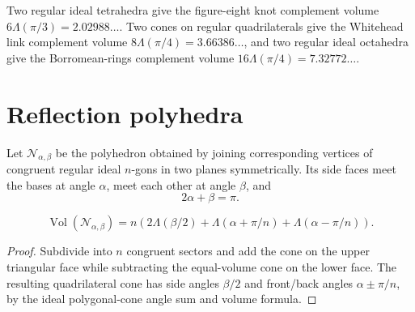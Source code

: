 \begin{example}
\label{thurston-ch07-basic-link-volumes}

Two regular ideal tetrahedra give the figure-eight knot complement volume $6\Lambda(\pi/3)=2.02988\ldots$.  Two cones on regular quadrilaterals give the Whitehead link complement volume $8\Lambda(\pi/4)=3.66386\ldots$, and two regular ideal octahedra give the Borromean-rings complement volume $16\Lambda(\pi/4)=7.32772\ldots$.
\end{example}

\section{Reflection polyhedra}

\begin{definition}
\label{thurston-ch07-symmetric-ideal-prism}

Let $\mathcal N_{\alpha,\beta}$ be the polyhedron obtained by joining corresponding vertices of congruent regular ideal $n$-gons in two planes symmetrically.  Its side faces meet the bases at angle $\alpha$, meet each other at angle $\beta$, and
\[
2\alpha+\beta=\pi.
\]
\end{definition}

\begin{proposition}
\label{thurston-ch07-symmetric-ideal-prism-volume}

\[
\operatorname{Vol}(\mathcal N_{\alpha,\beta})
=n\left(2\Lambda(\beta/2)+\Lambda(\alpha+\pi/n)+\Lambda(\alpha-\pi/n)\right).
\]
\end{proposition}
\begin{proof}
\sketch
Subdivide into $n$ congruent sectors and add the cone on the upper triangular face while subtracting the equal-volume cone on the lower face.  The resulting quadrilateral cone has side angles $\beta/2$ and front/back angles $\alpha\pm\pi/n$, by the ideal polygonal-cone angle sum and volume formula.
\end{proof}

